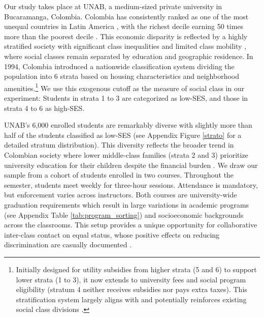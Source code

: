 \documentclass[11pt,a4paper,oneside]{article}
\begin{document}
Our study takes place at UNAB, a medium-sized private university in Bucaramanga, Colombia. Colombia has consistently ranked as one of the most unequal countries in Latin America \citep{barretoherrera2024regional}, with the richest decile earning 50 times more than the poorest decile \citep{comisioneconomicaparaamericalatinayel2023}. This economic disparity is reflected by a highly stratified society with significant class inequalities and limited class mobility \citep{angulo2012movilidad,garcia2015loteria}, where social classes remain separated by education and geographic residence. In 1994, Colombia introduced a nationwide classification system dividing the population into 6 strata based on housing characteristics and neighborhood amenities.\footnote{ Initially designed for utility subsidies from higher strata (5 and 6) to support lower strata (1 to 3), it now extends to university fees and social program eligibility (stratum 4 neither receives subsidies nor pays extra taxes). This stratification system largely aligns with and potentially reinforces existing social class divisions \citep{uribe2008estratificacion, guevara2019spatializing}.} We use this exogenous cutoff as the measure of social class in our experiment: Students in strata 1 to 3 are categorized as low-SES, and those in strata 4 to 6 as high-SES.

UNAB's 6,000 enrolled students are remarkably diverse with slightly more than half of the students classified as low-SES (see Appendix Figure \ref{strato} for a detailed stratum distribution). This diversity reflects the broader trend in Colombian society where lower middle-class families (strata 2 and 3) prioritize university education for their children despite the financial burden \citep[p. 103]{hudson_colombia_2010}. We draw our sample from a cohort of students enrolled in two courses. Throughout the semester, students meet weekly for three-hour sessions. Attendance is mandatory, but enforcement varies across instructors. Both courses are university-wide graduation requirements which result in large variations in academic programs (see Appendix Table \ref{tab:program_sorting}) and socioeconomic backgrounds across the classrooms. This setup provides a unique opportunity for collaborative inter-class contact on equal status, whose positive effects on reducing discrimination are casually documented \citep{rao2019familiarity, mousa2020building,lowe2021types}.
\end{document}
